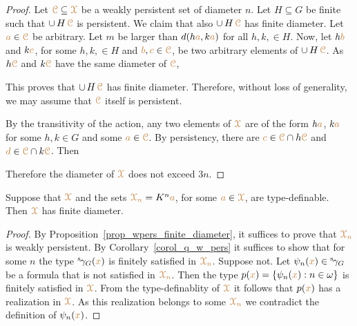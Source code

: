 \begin{proof}
  Let ${\color{brown}\EuScript C}\subseteq{\color{brown}\EuScript X}$ be a weakly persistent set of diameter $n$.
  Let $H\subseteq G$ be finite such that $\cup\,H\,{\color{brown}\EuScript C}$ is persistent.
  We claim that also $\cup\,H\,{\color{brown}\EuScript C}$ has finite diameter.
  Let ${\color{brown} a}\in{\color{brown}\EuScript C}$ be arbitrary.
  Let $m$ be larger than $d(h{\color{brown} a}, k{\color{brown} a})$ for all $h,k,\in H$.
  Now, let $h{\color{brown} b}$ and $k{\color{brown} c}$, for some $h,k,\in H$ and ${\color{brown} b},{\color{brown} c}\in{\color{brown}\EuScript C}$, be two arbitrary elements of $\cup\,H\,{\color{brown}\EuScript C}$.
  As $h{\color{brown}\EuScript C}$ and $k{\color{brown}\EuScript C}$ have the same diameter of ${\color{brown}\EuScript C}$, 



  This proves that $\cup\,H\,{\color{brown}\EuScript C}$ has finite diameter.
  Therefore, without loss of generality, we may assume that ${\color{brown}\EuScript C}$ itself is persistent.
  
  By the transitivity of the action, any two elements of ${\color{brown}\EuScript X}$ are of the form $h{\color{brown} a}$, $k{\color{brown} a}$ for some $h,k\in G$ and some ${\color{brown} a}\in{\color{brown}\EuScript C}$.
  By persistency, there are ${\color{brown} c}\in{\color{brown}\EuScript C}\cap h{\color{brown}\EuScript C}$ and ${\color{brown} d}\in{\color{brown}\EuScript C}\cap k{\color{brown}\EuScript C}$.
  Then 



  Therefore the diameter of ${\color{brown}\EuScript X}$ does not exceed $3n$.
\end{proof}

\begin{theorem}\label{thm_newelski}
  Suppose that ${\color{brown}\EuScript X}$ and the sets ${\color{brown}\EuScript X_n}=K^n{\color{brown} a}$, for some ${\color{brown} a}\in{\color{brown}\EuScript X}$, are type-definable.
  Then ${\color{brown}\EuScript X}$ has finite diameter.
\end{theorem}

\begin{proof}
  By Proposition~\ref{prop_wpers_finite_diameter}, it suffices to prove that ${\color{brown}\EuScript X_n}$ is weakly persistent.
  By Corollary~\ref{corol_q_w_pers} it suffices to show that for some $n$ the type ${}^{\rm s}\kern-.2ex\gamma_G({\color{brown} x})$ is finitely satisfied in ${\color{brown}\EuScript X_n}$.
  Suppose not.
  Let $\psi_n({\color{brown} x})\in{}^{\rm s}\kern-.2ex\gamma_G$ be a formula that is not satisfied in $\color{brown}\EuScript X_n$.
  Then the type $p({\color{brown} x})=\{\psi_n({\color{brown} x}):n\in\omega\}$ is finitely satisfied in ${\color{brown}\EuScript X}$.
  From the type-definablity of ${\color{brown}\EuScript X}$ it follows that $p({\color{brown} x})$ has a realization in ${\color{brown}\EuScript X}$.
  As this realization belongs to some ${\color{brown}\EuScript X_n}$ we contradict the definition of $\psi_n({\color{brown} x})$. 
\end{proof}

